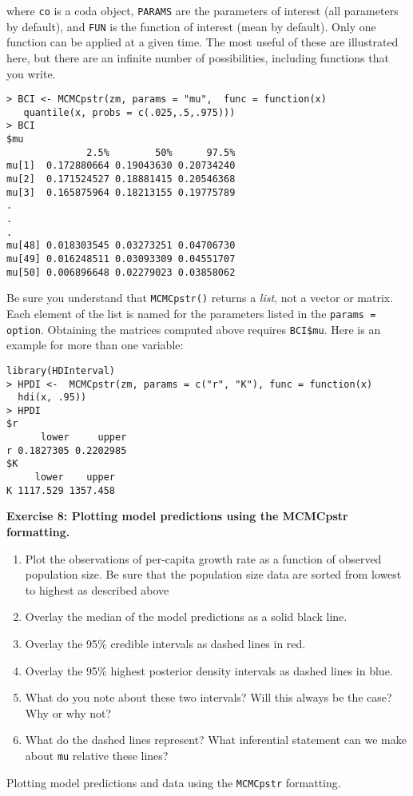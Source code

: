 \documentclass[12pt,english]{article}
\begin{document}
\noindent where \texttt{co} is a coda object, \texttt{PARAMS} are the parameters of interest (all parameters by default), and \texttt{FUN} is the function of interest (mean by default). Only one function can be applied at a given time. The most useful of these are illustrated here, but there are an infinite number of possibilities, including functions that you write.

\begin{Verbatim}
> BCI <- MCMCpstr(zm, params = "mu",  func = function(x)
   quantile(x, probs = c(.025,.5,.975)))  
> BCI
$mu
              2.5%        50%      97.5%
mu[1]  0.172880664 0.19043630 0.20734240
mu[2]  0.171524527 0.18881415 0.20546368
mu[3]  0.165875964 0.18213155 0.19775789
.
.
.
mu[48] 0.018303545 0.03273251 0.04706730
mu[49] 0.016248511 0.03093309 0.04551707
mu[50] 0.006896648 0.02279023 0.03858062
\end{Verbatim}

Be sure you understand that \texttt{MCMCpstr()} returns a \emph{list}, not a vector or matrix. Each element of the list is named for the parameters listed in the \texttt{params = option}. Obtaining the matrices computed above requires \texttt{BCI\$mu}. Here is an example for more than one variable:

\begin{Verbatim}
library(HDInterval)
> HPDI <-  MCMCpstr(zm, params = c("r", "K"), func = function(x) 
  hdi(x, .95))  
> HPDI
$r
      lower     upper
r 0.1827305 0.2202985
$K
     lower    upper
K 1117.529 1357.458
\end{Verbatim}

\belowcaptionskip=-40pt
\begin{exercise}
\begin{mdframed}
\doublespacing
\textbf{Exercise 8: Plotting model predictions using the MCMCpstr formatting.} 

\begin{enumerate}
\item Plot the observations of per-capita growth rate as a function of observed population size. Be sure that the population size data are sorted from lowest to highest as described above
\item Overlay the median of the model predictions as a solid black line. 
\item Overlay the 95\% credible intervals as dashed lines in red.  
\item Overlay the 95\% highest posterior density intervals as dashed lines in blue.
\item What do you note about these two intervals? Will this always be the case? Why or why not?
\item What do the dashed lines represent?  What inferential statement can we make about \texttt{mu} relative these lines?
\end{enumerate}
\end{mdframed}
\captionsetup{textformat=empty, labelformat=empty}
\caption[Plotting model predictions and data using the \texttt{MCMCpstr} formatting]{Plotting model predictions and data using the \texttt{MCMCpstr} formatting.}
\label{ex:plotting objects}
\end{exercise}
\belowcaptionskip=0pt
\end{document}
